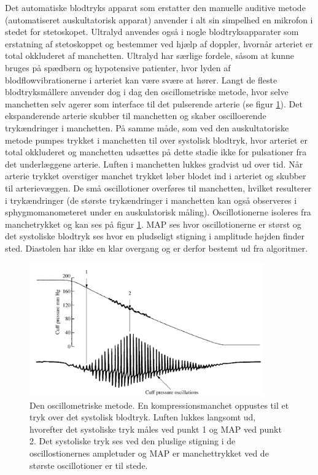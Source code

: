 Det automatiske blodtryks apparat som erstatter den manuelle auditive metode (automatiseret auskultatorisk apparat) anvender i alt sin simpelhed en mikrofon i stedet for stetoskopet. Ultralyd anvendes også i nogle blodtryksapparater som erstatning af stetoskoppet og bestemmer ved hjælp af doppler, hvornår arteriet er total okkluderet af manchetten. Ultralyd har særlige fordele, såsom at kunne bruges på spædbørn og hypotensive patienter, hvor lyden af blodflowvibrationerne i arteriet kan være svære at hører. Langt de fleste blodtryksmållere anvender dog i dag den oscillometriske metode, hvor selve manchetten selv agerer som interface til det pulserende arterie (se figur \ref{fig:OscillometriskMetode}). Det ekspanderende arterie skubber til manchetten og skaber oscilloerende trykændringer i manchetten. På samme måde, som ved den auskultatoriske metode pumpes trykket i manchetten til over systolisk blodtryk, hvor arteriet er total okkluderet og manchetten udsættes på dette stadie ikke for pulsationer fra det underlæggene arterie. Luften i manchetten lukkes gradvist ud over tid. Når arterie trykket overstiger manchet trykket løber blodet ind i arteriet og skubber til arterievæggen. De små oscillotioner overføres til manchetten, hvilket resulterer i trykændringer (de største trykændringer i manchetten kan også observeres i sphygmomanometeret under en auskulatorisk måling). Oscillotionerne isoleres fra manchetrykket og kan ses på figur \ref{fig:OscillometriskMetode}. MAP ses hvor oscillotionerne er størst og det systoliske blodtryk ses hvor en pludseligt stigning i amplitude højden finder sted. Diastolen har ikke en klar overgang og er derfor bestemt ud fra algoritmer.

\begin{figure}[H]
	\includegraphics[width=0.9\textwidth]{billeder/OscillometriskMetode.png}
	\caption{Den oscillometriske metode. En kompressionsmanchet oppustes til et tryk over det systolisk blodtryk. Luften lukkes langsomt ud, hvorefter det systoliske tryk måles ved punkt 1 og MAP ved punkt 2. Det systoliske tryk ses ved den pluslige stigning i de oscillostionernes ampletuder og MAP er manchettrykket ved de største oscillotioner er til stede.}\label{fig:OscillometriskMetode}
\end{figure}

